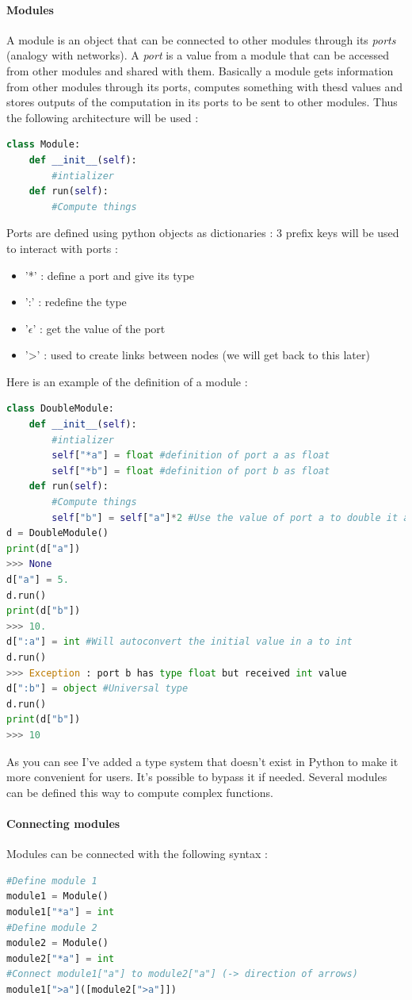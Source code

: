 \documentclass[11pt]{article}
\begin{document}
\paragraph{Modules}
A module is an object that can be connected to other modules through its \emph{ports} (analogy with networks). A \emph{port} is a value from a module that can be accessed from other modules and shared with them. Basically a module gets information from other modules through its ports, computes something with thesd values and  stores outputs of the computation in its ports to be sent to other modules. Thus the following architecture will be used :
\begin{lstlisting}[language=Python]
class Module:
	def __init__(self):
		#intializer
	def run(self):
		#Compute things
\end{lstlisting}
Ports are defined using python objects as dictionaries : 3 prefix keys will be used to interact with ports :
\begin{itemize}
\item '*' : define a port and give its type
\item ':' : redefine the type
\item '$\epsilon$' : get the value of the port
\item '>' : used to create links between nodes (we will get back to this later)
\end{itemize}
Here is an example of the definition of a module :
\begin{lstlisting}[language=Python]
class DoubleModule:
	def __init__(self):
		#intializer
		self["*a"] = float #definition of port a as float
		self["*b"] = float #definition of port b as float
	def run(self):
		#Compute things
		self["b"] = self["a"]*2 #Use the value of port a to double it and put it in port b
d = DoubleModule()
print(d["a"])
>>> None
d["a"] = 5.
d.run()
print(d["b"])
>>> 10.
d[":a"] = int #Will autoconvert the initial value in a to int
d.run()
>>> Exception : port b has type float but received int value
d[":b"] = object #Universal type
d.run()
print(d["b"])
>>> 10
\end{lstlisting}
As you can see I've added a type system that doesn't exist in Python to make it more convenient for users. It's possible to bypass it if needed. Several modules can be defined this way to compute complex functions.
\paragraph{Connecting modules}
Modules can be connected with the following syntax :
\begin{lstlisting}[language=Python]
#Define module 1
module1 = Module()
module1["*a"] = int
#Define module 2
module2 = Module()
module2["*a"] = int
#Connect module1["a"] to module2["a"] (-> direction of arrows)
module1[">a"]([module2[">a"]])
\end{lstlisting}
\end{document}
